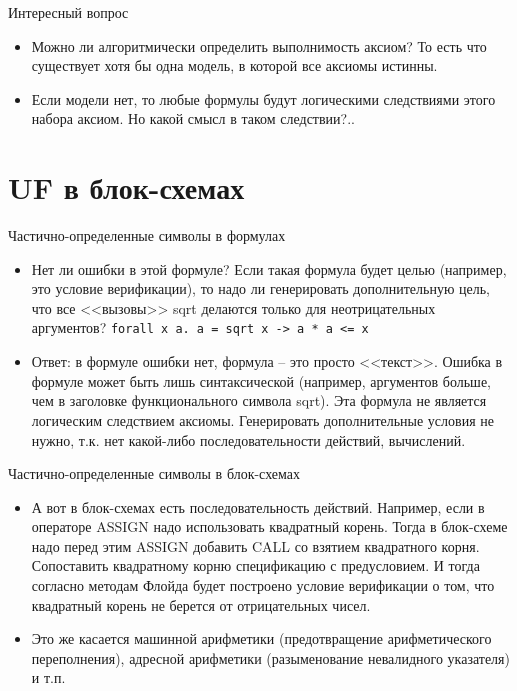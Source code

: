 \documentclass[hyperref={unicode=true}]{beamer}
\begin{document}
    \begin{frame}{Интересный вопрос}
    \begin{itemize}
    \item
    Можно ли алгоритмически определить выполнимость аксиом?
    То есть что существует хотя бы одна модель, в которой все аксиомы
    истинны.
    \item
    Если модели нет, то любые формулы будут логическими следствиями
    этого набора аксиом. Но какой смысл в таком следствии?..
    \end{itemize}
    \end{frame}

    \section{UF в блок-схемах}

    \begin{frame}{Частично-определенные символы в формулах}
    \begin{itemize}
    \item
    Нет ли ошибки в этой формуле? Если такая формула будет
    целью (например, это условие верификации), то надо ли
    генерировать дополнительную цель, что все <<вызовы>>
    sqrt делаются только для неотрицательных аргументов?
    \texttt{forall x a. a = sqrt x -> a * a <= x}
    \item
    Ответ: в формуле ошибки нет, формула -- это просто <<текст>>.
    Ошибка в формуле может быть лишь синтаксической (например,
    аргументов больше, чем в заголовке функционального символа sqrt).
    Эта формула не является логическим следствием аксиомы.
    Генерировать дополнительные условия не нужно, т.к. нет
    какой-либо последовательности действий, вычислений.
    \end{itemize}
    \end{frame}

    \begin{frame}{Частично-определенные символы в блок-схемах}
    \begin{itemize}
    \item
    А вот в блок-схемах есть последовательность действий.
    Например, если в операторе ASSIGN надо использовать
    квадратный корень. Тогда в блок-схеме надо перед этим ASSIGN
    добавить CALL со взятием квадратного корня. Сопоставить
    квадратному корню спецификацию с предусловием. И тогда
    согласно методам Флойда будет построено условие верификации
    о том, что квадратный корень не берется от отрицательных чисел.
    \item
    Это же касается машинной арифметики (предотвращение арифметического
            переполнения), адресной арифметики (разыменование
                невалидного указателя) и т.п.
    \end{itemize}
    \end{frame}
\end{document}
